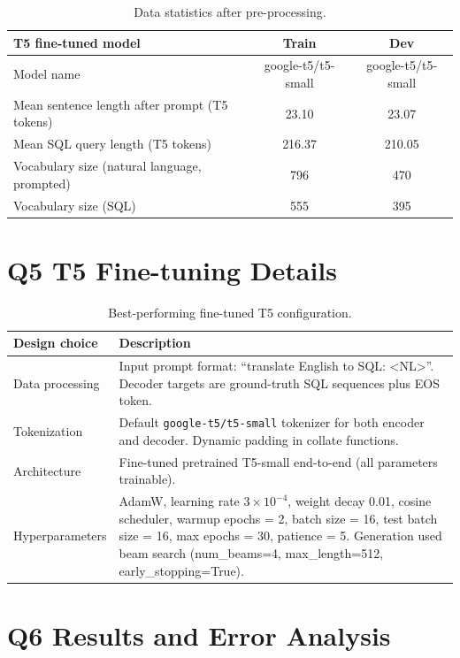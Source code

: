 \documentclass{article}
\begin{document}
\begin{table}[h!]
\centering
\begin{tabular}{lcc}
\toprule
\textbf{T5 fine-tuned model} & Train & Dev \\
\midrule
Model name & google-t5/t5-small & google-t5/t5-small \\
Mean sentence length after prompt (T5 tokens) & 23.10 & 23.07 \\
Mean SQL query length (T5 tokens) & 216.37 & 210.05 \\
Vocabulary size (natural language, prompted) & 796 & 470 \\
Vocabulary size (SQL) & 555 & 395 \\
\bottomrule
\end{tabular}
\caption{Data statistics after pre-processing.}
\label{tab:data_stats_after}
\end{table}

\newpage

\section*{Q5 T5 Fine-tuning Details}
\begin{table}[h!]
\centering
\begin{tabular}{p{3.5cm}p{10cm}}
\toprule
Design choice & Description \\
\midrule
Data processing & Input prompt format: ``translate English to SQL: <NL>''.
Decoder targets are ground-truth SQL sequences plus EOS token. \\
Tokenization & Default \texttt{google-t5/t5-small} tokenizer for both encoder and decoder.
Dynamic padding in collate functions. \\
Architecture & Fine-tuned pretrained T5-small end-to-end (all parameters trainable). \\
Hyperparameters & AdamW, learning rate $3\times10^{-4}$, weight decay 0.01, cosine scheduler, warmup epochs = 2,
batch size = 16, test batch size = 16, max epochs = 30, patience = 5. Generation used beam search
(num\_beams=4, max\_length=512, early\_stopping=True). \\
\bottomrule
\end{tabular}
\caption{Best-performing fine-tuned T5 configuration.}
\label{tab:t5_results_ft}
\end{table}

\section*{Q6 Results and Error Analysis}
\end{document}
